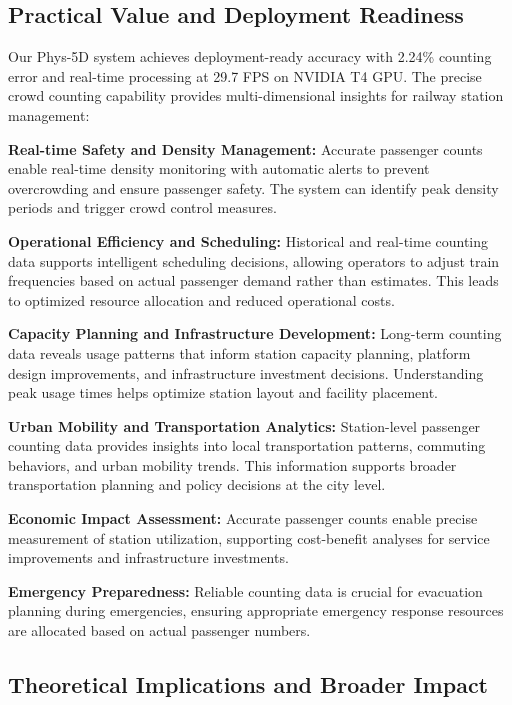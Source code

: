 \subsection{Practical Value and Deployment Readiness}

Our Phys-5D system achieves deployment-ready accuracy with 2.24\% counting error and real-time processing at 29.7 FPS on NVIDIA T4 GPU. The precise crowd counting capability provides multi-dimensional insights for railway station management:

\textbf{Real-time Safety and Density Management:} Accurate passenger counts enable real-time density monitoring with automatic alerts to prevent overcrowding and ensure passenger safety. The system can identify peak density periods and trigger crowd control measures.

\textbf{Operational Efficiency and Scheduling:} Historical and real-time counting data supports intelligent scheduling decisions, allowing operators to adjust train frequencies based on actual passenger demand rather than estimates. This leads to optimized resource allocation and reduced operational costs.

\textbf{Capacity Planning and Infrastructure Development:} Long-term counting data reveals usage patterns that inform station capacity planning, platform design improvements, and infrastructure investment decisions. Understanding peak usage times helps optimize station layout and facility placement.

\textbf{Urban Mobility and Transportation Analytics:} Station-level passenger counting data provides insights into local transportation patterns, commuting behaviors, and urban mobility trends. This information supports broader transportation planning and policy decisions at the city level.

\textbf{Economic Impact Assessment:} Accurate passenger counts enable precise measurement of station utilization, supporting cost-benefit analyses for service improvements and infrastructure investments.

\textbf{Emergency Preparedness:} Reliable counting data is crucial for evacuation planning during emergencies, ensuring appropriate emergency response resources are allocated based on actual passenger numbers.

\subsection{Theoretical Implications and Broader Impact}

